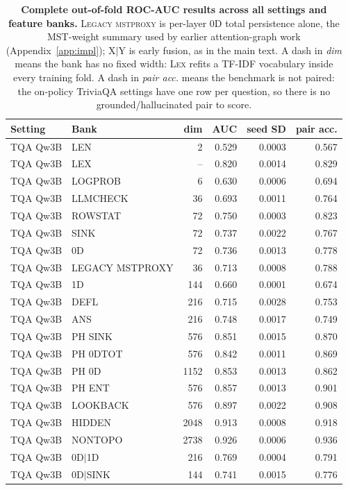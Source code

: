 \begin{longtable}{llrrrr}
\caption{\textbf{Complete out-of-fold ROC-AUC results across all settings and feature banks.} \textsc{Legacy mstproxy} is per-layer $0$D total persistence alone, the MST-weight summary used by earlier attention-graph work (Appendix~\ref{app:impl}); X$\mid$Y is early fusion, as in the main text. A dash in \emph{dim} means the bank has no fixed width: \textsc{Lex} refits a TF-IDF vocabulary inside every training fold. A dash in \emph{pair acc.} means the benchmark is not paired: the on-policy TriviaQA settings have one row per question, so there is no grounded/hallucinated pair to score.}\label{tab:auc_full}\\
\toprule
Setting & Bank & dim & AUC & seed SD & pair acc. \\
\midrule\endhead
TQA Qw3B & LEN & 2 & 0.529 & 0.0003 & 0.567 \\
TQA Qw3B & LEX & -- & 0.820 & 0.0014 & 0.829 \\
TQA Qw3B & LOGPROB & 6 & 0.630 & 0.0006 & 0.694 \\
TQA Qw3B & LLMCHECK & 36 & 0.693 & 0.0011 & 0.764 \\
TQA Qw3B & ROWSTAT & 72 & 0.750 & 0.0003 & 0.823 \\
TQA Qw3B & SINK & 72 & 0.737 & 0.0022 & 0.767 \\
TQA Qw3B & 0D & 72 & 0.736 & 0.0013 & 0.778 \\
TQA Qw3B & LEGACY MSTPROXY & 36 & 0.713 & 0.0008 & 0.788 \\
TQA Qw3B & 1D & 144 & 0.660 & 0.0001 & 0.674 \\
TQA Qw3B & DEFL & 216 & 0.715 & 0.0028 & 0.753 \\
TQA Qw3B & ANS & 216 & 0.748 & 0.0017 & 0.749 \\
TQA Qw3B & PH SINK & 576 & 0.851 & 0.0015 & 0.870 \\
TQA Qw3B & PH 0DTOT & 576 & 0.842 & 0.0011 & 0.869 \\
TQA Qw3B & PH 0D & 1152 & 0.853 & 0.0013 & 0.862 \\
TQA Qw3B & PH ENT & 576 & 0.857 & 0.0013 & 0.901 \\
TQA Qw3B & LOOKBACK & 576 & 0.897 & 0.0022 & 0.908 \\
TQA Qw3B & HIDDEN & 2048 & 0.913 & 0.0008 & 0.918 \\
TQA Qw3B & NONTOPO & 2738 & 0.926 & 0.0006 & 0.936 \\
TQA Qw3B & 0D$\mid$1D & 216 & 0.769 & 0.0004 & 0.791 \\
TQA Qw3B & 0D$\mid$SINK & 144 & 0.741 & 0.0015 & 0.776 \\

\end{longtable}
